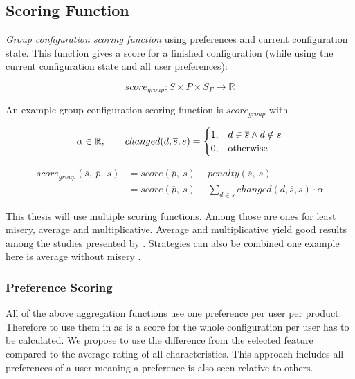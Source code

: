 
\subsection{Scoring Function}

\emph{Group configuration scoring function} using preferences and current configuration state. This function gives a score for a finished configuration (while using the current configuration state and all user preferences):

\begin{equation}
    score_{group}: S \times P \times S_F \to \mathbb{R}
\end{equation}

An example group configuration scoring function is $score_{group}$ with

\begin{equation}
    \notag \alpha \in \mathbb{R}, \qquad     changed(d,\overline{s}, s) = 
    \begin{cases}
      1, & d \in \overline{s} \land d \notin s \\
      0, & \text{otherwise}
    \end{cases}
\end{equation}

\begin{equation}
    \begin{split}
        score_{group}(\overline{s},\ \overline{p},\ s)
        & = score(\overline{p},\ s) - penalty(\overline{s},\ s) \\
        & = score(\overline{p},\ s) - \sum_{d \in \overline{s}} changed(d,\overline{s}, s) \cdot \alpha
    \end{split}
\end{equation}

This thesis will use multiple scoring functions. Among those are ones for least misery, average and multiplicative. Average and multiplicative yield good results among the studies presented by \citeauthor{Masthoff2015}. Strategies can also be combined one example here is average without misery \cite{Masthoff2015}.

\subsubsection{Preference Scoring}

All of the above aggregation functions use one preference per user per product. Therefore to use them in as is a score for the whole configuration per user has to be calculated. We propose to use the difference from the selected feature compared to the average rating of all characteristics. This approach includes all preferences of a user meaning a preference is also seen relative to others.

